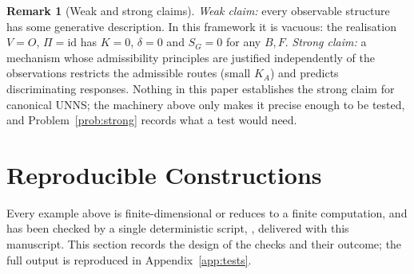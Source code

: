 \documentclass[11pt,a4paper]{article}
\newcommand{\id}{\mathrm{id}}
\newcommand{\defic}{\delta}
\theoremstyle{plain}
\theoremstyle{definition}
\newtheorem{remark}[theorem]{Remark}
\begin{document}
\begin{remark}[Weak and strong claims]\label{rem:weakstrong}
\emph{Weak claim:} every observable structure has some generative description. In this framework it is vacuous: the realisation $V=O$, $\Pi=\id$ has $K=0$, $\defic=0$ and $S_G=0$ for any $B,F$.
\emph{Strong claim:} a mechanism whose admissibility principles are justified independently of the observations restricts the admissible routes (small $K_A$) and predicts discriminating responses. Nothing in this paper establishes the strong claim for canonical UNNS; the machinery above only makes it precise enough to be tested, and Problem~\ref{prob:strong} records what a test would need.
\end{remark}
\section{Reproducible Constructions}\label{sec:repro}
Every example above is finite-dimensional or reduces to a finite computation, and has been checked by a single deterministic script, , delivered with this manuscript. This section records the design of the checks and their outcome; the full output is reproduced in Appendix~\ref{app:tests}.
\end{document}
